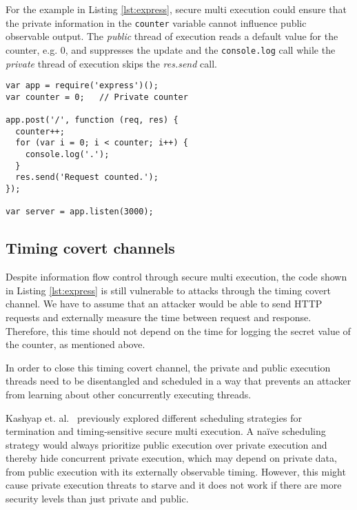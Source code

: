 \documentclass[10pt,preprint]{sigplanconf}
\begin{document}
For the example in Listing \ref{lst:express}, secure multi execution could ensure that the private information in the \verb+counter+ variable cannot influence public observable output.  The \emph{public} thread of execution reads a default value for the counter, e.g. 0, and suppresses the update and the \verb+console.log+ call while the \emph{private} thread of execution skips the \emph{res.send} call.

\begin{lstlisting}[float,label=lst:express,caption={JavaScript Server Code which leaks the value of the private request counter via the timing covert channel.}]
var app = require('express')();
var counter = 0;   // Private counter

app.post('/', function (req, res) {
  counter++;
  for (var i = 0; i < counter; i++) {
    console.log('.');
  }
  res.send('Request counted.');
});

var server = app.listen(3000);
\end{lstlisting}

\subsection{Timing covert channels}

Despite information flow control through secure multi execution, the code shown in Listing \ref{lst:express} is still vulnerable to attacks through the timing covert channel.  We have to assume that an attacker would be able to send HTTP requests and externally measure the time between request and response.  Therefore, this time should not depend on the time for logging the secret value of the counter, as mentioned above.

In order to close this timing covert channel, the private and public execution threads need to be disentangled and scheduled in a way that prevents an attacker from learning about other concurrently executing threads.

Kashyap et. al.~\cite{kashyap2011} previously explored different scheduling strategies for termination and timing-sensitive secure multi execution.  A na\"ive scheduling strategy would always prioritize public execution over private execution and thereby hide concurrent private execution, which may depend on private data, from public execution with its externally observable timing.  However, this might cause private execution threats to starve and it does not work if there are more security levels than just private and public.
\end{document}
